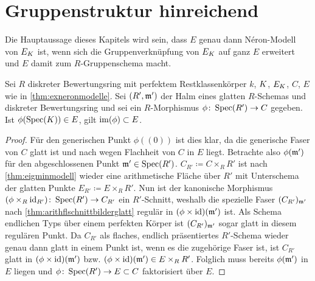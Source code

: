 
  
\section{Gruppenstruktur hinreichend}\label{chap:gruppenstrukturhinreichend}
Die Hauptaussage dieses Kapitels wird sein, dass $E$ genau dann
Néron-Modell von $E_{K}$ ist, wenn sich die Gruppenverknüpfung von
$E_{K}$ auf ganz $E$ erweitert und $E$ damit zum $R$-Gruppenschema
macht.
\begin{Lemma}\label{thm:schnittearithmflglatt}
  Sei $R$ diskreter Bewertungsring mit perfektem Restklassenkörper
  $k$, $K$, $E_{K}$, $C$, $E$ wie in \ref{thm:exneronmodelle}.
  Sei $(R',\mathfrak{m}')$ der Halm eines glatten $R$-Schemas und diskreter
  Bewertungsring
  und sei ein $R$-Morphismus $\phi\colon \operatorname{Spec}(R')\to C$ gegeben.
  Ist $\phi(\operatorname{Spec}(K))\in E$, gilt $\operatorname{im}(\phi)\subset E$.
  \begin{proof}
    Für den generischen Punkt $\phi((0))$ ist dies klar, da die
    generische Faser von $C$ glatt ist und nach
    \cite[8.5, Proposition 17]{bosch} wegen Flachheit von $C$ in $E$
    liegt. 
    Betrachte also $\phi(\mathfrak{m}')$ für den abgeschlossenen Punkt
    $\mathfrak{m}'\in\operatorname{Spec}(R')$.
    $C_{R'}\coloneqq C\times_R R'$ ist nach
    \ref{thm:eigminmodell} wieder eine arithmetische Fläche über
    $R'$ mit Unterschema der glatten Punkte
    $E_{R'}\coloneqq E\times_R R'$.
    Nun ist der kanonische Morphismus
    $(\phi\times_{R}\mathrm{id}_{R'})\colon\operatorname{Spec}(R')\to C_{R'}$ ein 
    $R'$-Schnitt, weshalb die spezielle Faser $(C_{R'})_{\mathfrak{m}'}$ nach
    \ref{thm:arithflschnittbilderglatt} regulär in
    $(\phi\times\mathrm{id})(\mathfrak{m}')$ ist.
    Als Schema endlichen Typs über einem
    perfekten Körper ist $(C_{R'})_{\mathfrak{m}'}$ sogar glatt in diesem
    regulären Punkt.
    Da $C_{R'}$ als flaches, endlich präsentiertes $R'$-Schema wieder
    genau dann glatt in einem Punkt ist, wenn es die zugehörige Faser
    ist, ist $C_{R'}$ glatt in $(\phi\times\mathrm{id})(\mathfrak{m}')$ bzw.
    $(\phi\times\mathrm{id})(\mathfrak{m}')\in E\times_R R'$. Folglich muss bereits
    $\phi(\mathfrak{m}')$ in $E$ liegen und $\phi\colon \operatorname{Spec}(R')\to E\subset C$
    faktorisiert über $E$.
  \end{proof}
\end{Lemma}  

